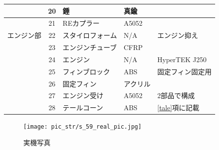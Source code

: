 \documentclass[a4paper,11pt,uplatex]{jsarticle}
\begin{document}
\begin{longtable}[H]{cclll}
	      & 20  & 錘         & 真鍮    &                                  \\\midrule
	      & 21  & REカプラー    & A5052 &                                  \\ \midrule
	エンジン部 & 22  & スタイロフォーム  & N/A   & エンジン抑え                           \\
	      & 23  & エンジンチューブ  & CFRP                                     \\
	      & 24  & エンジン      & N/A   & HyperTEK J250                    \\
	      & 25  & フィンブロック   & ABS   & 固定フィン固定用                         \\
	      & 26  & 固定フィン     & アクリル  &                                  \\
	      & 27  & エンジン受け    & A5052 & 2部品で構成                           \\
	      & 28  & テールコーン    & ABS   & \ref{tale}項に記載                   \\
	\bottomrule
\end{longtable}
\renewcommand{\arraystretch}{1.0}


\begin{figure}[H]
	\centering
	\texttt{[image: pic\_str/s\_59\_real\_pic.jpg]}
	\caption{実機写真}
	\label{s_real1}
\end{figure}
\end{document}
